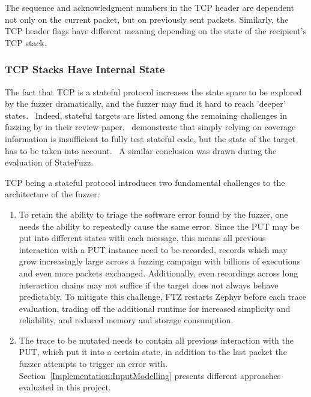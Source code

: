 \documentclass{article}
\newcommand{\proj}{FTZ\xspace}
\let\savedCite=\cite
\renewcommand{\cite}{\unskip~\savedCite}
\begin{document}
\begin{multicols}{2}
  The sequence and acknowledgment numbers in the TCP header are dependent not only on the current packet, but on previously sent packets. Similarly, the TCP header flags have different meaning depending on the state of the recipient's TCP stack.

  \subsubsection{TCP Stacks Have Internal State}
  \label{Background:TcpIsStateful}

  The fact that TCP is a stateful protocol increases the state space to be explored by the fuzzer dramatically, and the fuzzer may find it hard to reach 'deeper' states.\cite{StatefulReview} Indeed, stateful targets are listed among the remaining challenges in fuzzing by \citeauthor{ChallengesAndReflections} in their review paper.\cite{ChallengesAndReflections} \citeauthor{SGFuzz} demonstrate that simply relying on coverage information is insufficient to fully test stateful code, but the state of the target has to be taken into account.\cite{SGFuzz} A similar conclusion was drawn during the evaluation of StateFuzz.\cite{StateFuzz}

  TCP being a stateful protocol introduces two fundamental challenges to the architecture of the fuzzer:
  \begin{enumerate}
    \item To retain the ability to triage the software error found by the fuzzer, one needs the ability to repeatedly cause the same error. Since the PUT may be put into different states with each message, this means all previous interaction with a PUT instance need to be recorded, records which may grow increasingly large across a fuzzing campaign with billions of executions and even more packets exchanged. Additionally, even recordings across long interaction chains may not suffice if the target does not always behave predictably. To mitigate this challenge, \proj restarts Zephyr before each trace evaluation, trading off the additional runtime for increased simplicity and reliability, and reduced memory and storage consumption.
    \item The trace to be mutated needs to contain all previous interaction with the PUT, which put it into a certain state, in addition to the last packet the fuzzer attempts to trigger an error with. Section~\ref{Implementation:InputModelling} presents different approaches evaluated in this project.
  \end{enumerate}


\end{multicols}
\end{document}
